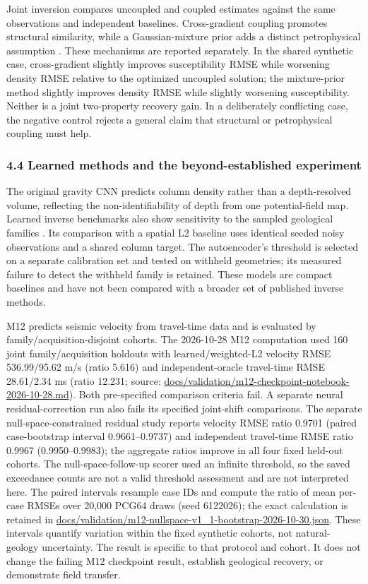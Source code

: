 Joint inversion compares uncoupled and coupled estimates against the
same observations and independent baselines. Cross-gradient coupling
promotes structural similarity, while a Gaussian-mixture prior adds a
distinct petrophysical assumption \cite{simpegJoint,astic2020}. These
mechanisms are reported separately. In the shared synthetic case,
cross-gradient slightly improves susceptibility RMSE while worsening
density RMSE relative to the optimized uncoupled solution; the
mixture-prior method slightly improves density RMSE while slightly
worsening susceptibility. Neither is a joint two-property recovery gain.
In a deliberately conflicting case, the negative control rejects a
general claim that structural or petrophysical coupling must help.

\subsubsection{4.4 Learned methods and the beyond-established
experiment}\label{learned-methods-and-the-beyond-established-experiment}

The original gravity CNN predicts column density rather than a
depth-resolved volume, reflecting the non-identifiability of depth from
one potential-field map. Learned inverse benchmarks also show
sensitivity to the sampled geological families \cite{openfwi}. Its
comparison with a spatial L2 baseline uses identical seeded noisy
observations and a shared column target. The autoencoder's threshold is
selected on a separate calibration set and tested on withheld
geometries; its measured failure to detect the withheld family is
retained. These models are compact baselines and have not been compared
with a broader set of published inverse methods.

M12 predicts seismic velocity from travel-time data and is evaluated by
family/acquisition-disjoint cohorts. The 2026-10-28 M12 computation used
160 joint family/acquisition holdouts with learned/weighted-L2 velocity
RMSE 536.99/95.62 m/s (ratio 5.616) and independent-oracle travel-time
RMSE 28.61/2.34 ms (ratio 12.231; source:
\url{docs/validation/m12-checkpoint-notebook-2026-10-28.md}). Both
pre-specified comparison criteria fail. A separate neural
residual-correction run also fails its specified joint-shift
comparisons. The separate null-space-constrained residual study reports
velocity RMSE ratio 0.9701 (paired case-bootstrap interval
0.9661--0.9737) and independent travel-time RMSE ratio 0.9967
(0.9950--0.9983); the aggregate ratios improve in all four fixed
held-out cohorts. The null-space-follow-up scorer used an infinite
threshold, so the saved exceedance counts are not a valid threshold
assessment and are not interpreted here. The paired intervals resample
case IDs and compute the ratio of mean per-case RMSEs over 20,000 PCG64
draws (seed 6122026); the exact calculation is retained in
\url{docs/validation/m12-nullspace-v1_1-bootstrap-2026-10-30.json}.
These intervals quantify variation within the fixed synthetic cohorts,
not natural-geology uncertainty. The result is specific to that protocol
and cohort. It does not change the failing M12 checkpoint result,
establish geological recovery, or demonstrate field transfer.

